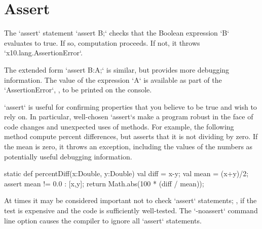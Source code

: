 
\section{Assert}

The \xcd`assert` statement 
\xcd`assert B;` 
checks that the Boolean expression \xcd`B` evaluates to true.  If so,
computation proceeds.  If not, it throws \xcd`x10.lang.AssertionError`.

The extended form 
\xcd`assert B:A;`
is similar, but provides more debugging information.  The value of the
expression \xcd`A` is available as part of the \xcd`AssertionError`, \eg, to
be printed on the console.

\begin{ex}
\xcd`assert` is useful for confirming properties that you believe to be true
and wish to rely on.  In particular, well-chosen \xcd`assert`s make a program
robust in the face of code changes and unexpected uses of methods.
For example, the following method compute percent differences, but asserts
that it is not dividing by zero.  If the mean is zero, it throws an exception,
including the values of the numbers as potentially useful debugging
information. 
\begin{xten}
static def percentDiff(x:Double, y:Double) {
  val diff = x-y;
  val mean = (x+y)/2;
  assert mean != 0.0  : [x,y]; 
  return Math.abs(100 * (diff / mean));
}
\end{xten}

\end{ex}


At times it may be considered important not to check \xcd`assert` statements;
\eg, if the test is expensive and the code is sufficiently well-tested.  The
\xcd`-noassert` command line option causes the compiler to ignore all
\xcd`assert` statements. 
